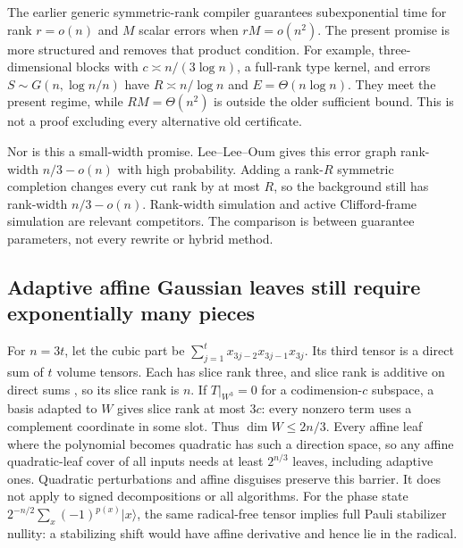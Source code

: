 \documentclass[11pt,a4paper]{article}
\begin{document}
The earlier generic symmetric-rank compiler guarantees subexponential
time for rank $r=o(n)$ and $M$ scalar errors when $rM=o(n^2)$.
The present promise is more structured and removes that product
condition. For example, three-dimensional blocks with
$c\asymp n/(3\log n)$, a full-rank type kernel, and errors
$S\sim G(n,\log n/n)$ have
$R\asymp n/\log n$ and $E=\Theta(n\log n)$.
They meet the present regime, while $RM=\Theta(n^2)$ is outside
the older sufficient bound. This is not a proof excluding every
alternative old certificate.

Nor is this a small-width promise. Lee--Lee--Oum
\cite[Theorem 1.1(ii)]{rankwidth} gives this error graph
rank-width $n/3-o(n)$ with high probability. Adding a rank-$R$
symmetric completion changes every cut rank by at most $R$,
so the background still has rank-width $n/3-o(n)$.
Rank-width simulation \cite{colnet} and active Clifford-frame
simulation \cite{clifft} are relevant competitors. The comparison
is between guarantee parameters, not every rewrite or hybrid method.

\subsection{Adaptive affine Gaussian leaves still require exponentially many pieces}
For $n=3t$, let the cubic part be
$\sum_{j=1}^t x_{3j-2}x_{3j-1}x_{3j}$.
Its third tensor is a direct sum of $t$ volume tensors.
Each has slice rank three, and slice rank is additive on direct
sums \cite{gowers}, so its slice rank is $n$.
If $T|_{W^3}=0$ for a codimension-$c$ subspace, a basis adapted
to $W$ gives slice rank at most $3c$: every nonzero term uses
a complement coordinate in some slot. Thus $\dim W\le2n/3$.
Every affine leaf where the polynomial becomes quadratic has
such a direction space, so any affine quadratic-leaf cover
of all inputs needs at least $2^{n/3}$ leaves, including adaptive
ones. Quadratic perturbations and affine disguises preserve this
barrier. It does not apply to signed decompositions or all algorithms.
For the phase state $2^{-n/2}\sum_x(-1)^{p(x)}|x\rangle$,
the same radical-free tensor implies full Pauli stabilizer nullity:
a stabilizing shift would have affine derivative and hence lie
in the radical.
\end{document}
